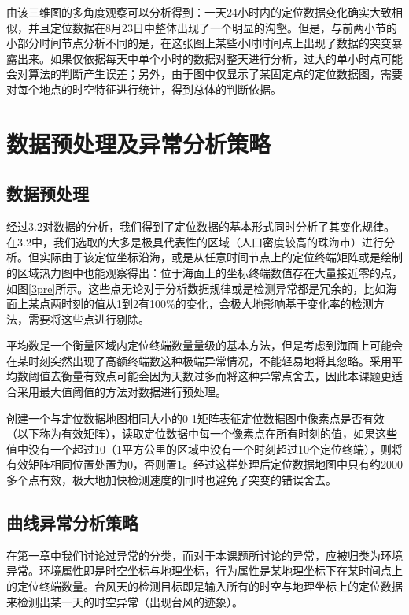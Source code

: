 \documentclass[a4paper,AutoFakeBold,oneside,12pt]{book}
\begin{document}

	由该三维图的多角度观察可以分析得到：一天24小时内的定位数据变化确实大致相似，并且定位数据在8月23日中整体出现了一个明显的沟壑。但是，与前两小节的小部分时间节点分析不同的是，在这张图上某些小时时间点上出现了数据的突变暴露出来。如果仅依据每天中单个小时的数据对整天进行分析，过大的单小时点可能会对算法的判断产生误差；另外，由于图中仅显示了某固定点的定位数据图，需要对每个地点的时空特征进行统计，得到总体的判断依据。

\section{数据预处理及异常分析策略}

\subsection{数据预处理}
	经过3.2对数据的分析，我们得到了定位数据的基本形式同时分析了其变化规律。在3.2中，我们选取的大多是极具代表性的区域（人口密度较高的珠海市）进行分析。但实际由于该定位坐标沿海，或是从任意时间节点上的定位终端矩阵或是绘制的区域热力图中也能观察得出：位于海面上的坐标终端数值存在大量接近零的点，如图\ref{3pre}所示。这些点无论对于分析数据规律或是检测异常都是冗余的，比如海面上某点两时刻的值从1到2有100\%的变化，会极大地影响基于变化率的检测方法，需要将这些点进行剔除。


	平均数是一个衡量区域内定位终端数量量级的基本方法，但是考虑到海面上可能会在某时刻突然出现了高额终端数这种极端异常情况，不能轻易地将其忽略。采用平均数阈值去衡量有效点可能会因为天数过多而将这种异常点舍去，因此本课题更适合采用最大值阈值的方法对数据进行预处理。

	创建一个与定位数据地图相同大小的0-1矩阵表征定位数据图中像素点是否有效（以下称为有效矩阵），读取定位数据中每一个像素点在所有时刻的值，如果这些值中没有一个超过10（1平方公里的区域中没有一个时刻超过10个定位终端），则将有效矩阵相同位置处置为0，否则置1。经过这样处理后定位数据地图中只有约2000多个点有效，极大地加快检测速度的同时也避免了突变的错误舍去。

\subsection{曲线异常分析策略}
	在第一章中我们讨论过异常的分类，而对于本课题所讨论的异常，应被归类为环境异常。环境属性即是时空坐标与地理坐标，行为属性是某地理坐标下在某时间点上的定位终端数量。台风天的检测目标即是输入所有的时空与地理坐标上的定位数据来检测出某一天的时空异常（出现台风的迹象）。
\end{document}
